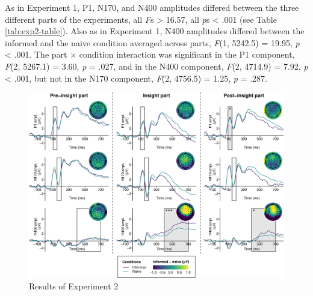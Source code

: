 \documentclass[
  english,
  man,12pt,twoside]{apa7}
\begin{document}
As in Experiment 1, P1, N170, and N400 amplitudes differed between the three different parts of the experiments, all \emph{F}s \textgreater{} 16.57, all \emph{p}s \textless{} .001 (see Table \ref{tab:exp2-table}). Also as in Experiment 1, N400 amplitudes differed between the informed and the naive condition averaged across parts, \emph{F}(1, 5242.5) = 19.95, \emph{p} \textless{} .001. The part × condition interaction was significant in the P1 component, \emph{F}(2, 5267.1) = 3.60, \emph{p} = .027, and in the N400 component, \emph{F}(2, 4714.9) = 7.92, \emph{p} \textless{} .001, but not in the N170 component, \emph{F}(2, 4756.5) = 1.25, \emph{p} = .287.



\begin{figure}

{\centering \includegraphics[width=1\linewidth]{manuscript_files/figure-latex/exp2-plot-1} 

}

\caption{Results of Experiment 2}\label{fig:exp2-plot}
\end{figure}
\end{document}

